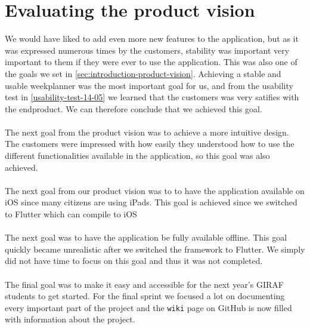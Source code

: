 \section{Evaluating the product vision}
We would have liked to add even more new features to the application, but as it was expressed numerous times by the customers, stability was important very important to them if they were ever to use the application. This was also one of the goals we set in \autoref{sec:introduction-product-vision}. Achieving a stable and usable weekplanner was the most important goal for us, and from the usability test in \autoref{usability-test-14-05} we learned that the customers was very satifies with the endproduct. We can therefore conclude that we achieved this goal. 
\\\\
The next goal from the product vision was to achieve a more intuitive design. The customers were impressed with how easily they understood how to use the different functionalities available in the application, so this goal was also achieved. 
\\\\
The next goal from our product vision was to to have the application available on iOS since many citizens are using iPads. This goal is achieved since we switched to Flutter which can compile to iOS
\\\\
The next goal was to have the application be fully available offline. This goal quickly became unrealistic after we switched the framework to Flutter. We simply did not have time to focus on this goal and thus it was not completed.
\\\\
The final goal was to make it easy and accessible for the next year's GIRAF students to get started. For the final sprint we focused a lot on documenting every important part of the project and the \texttt{wiki} page on GitHub is now filled with information about the project. 
